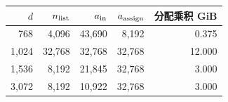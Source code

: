 \begin{tabular}{@{}rrrrr@{}}
\toprule
$d$ & $n_{\rm list}$ & $a_{\rm in}$ & $a_{\rm assign}$ & 分配乘积 GiB \\
\midrule
768 & 4,096 & 43,690 & 8,192 & 0.375 \\
1,024 & 32,768 & 32,768 & 32,768 & 12.000 \\
1,536 & 8,192 & 21,845 & 32,768 & 3.000 \\
3,072 & 8,192 & 10,922 & 32,768 & 3.000 \\
\bottomrule
\end{tabular}
